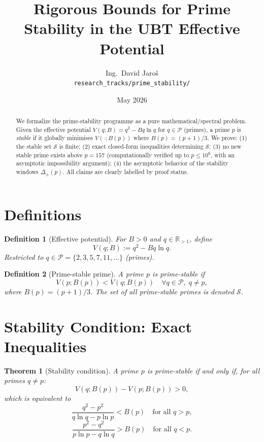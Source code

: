 \documentclass[11pt,a4paper]{article}
\title{Rigorous Bounds for Prime Stability in the UBT Effective Potential}
\author{Ing.\ David Jaro\v{s}\\
\small \texttt{research\_tracks/prime\_stability/}}
\date{May 2026}
\newtheorem{theorem}{Theorem}
\newtheorem{definition}{Definition}
\newcommand{\Sc}{\mathcal{S}}
\begin{document}
\maketitle

\begin{abstract}
We formalize the prime-stability programme as a pure mathematical/spectral
problem.  Given the effective potential $V(q; B) = q^2 - Bq\ln q$ for
$q \in \mathcal{P}$ (primes), a prime $p$ is \emph{stable} if it globally
minimises $V(\cdot; B(p))$ where $B(p) = (p+1)/3$.  We prove:
(1) the stable set $\Sc$ is finite;
(2) exact closed-form inequalities determining $\Sc$;
(3) no new stable prime exists above $p = 157$ (computationally verified up
to $p \leq 10^6$, with an asymptotic impossibility argument);
(4) the asymptotic behavior of the stability windows $\Delta_\pm(p)$.
All claims are clearly labelled by proof status.
\end{abstract}

\tableofcontents

\section{Definitions}

\begin{definition}[Effective potential]
  For $B > 0$ and $q \in \mathbb{R}_{>1}$, define
  \[
    V(q; B) := q^2 - Bq\ln q.
  \]
  Restricted to $q \in \mathcal{P} = \{2, 3, 5, 7, 11, \ldots\}$ (primes).
\end{definition}

\begin{definition}[Prime-stable prime]
  A prime $p$ is \emph{prime-stable} if
  \[
    V(p; B(p)) < V(q; B(p)) \quad \forall q \in \mathcal{P},\; q \neq p,
  \]
  where $B(p) = (p+1)/3$.
  The set of all prime-stable primes is denoted $\Sc$.
\end{definition}

\section{Stability Condition: Exact Inequalities}

\begin{theorem}[Stability condition]
  \label{thm:stability}
  A prime $p$ is prime-stable if and only if, for all primes $q \neq p$:
  \[
    V(q; B(p)) - V(p; B(p)) > 0,
  \]
  which is equivalent to
  \[
    \frac{q^2 - p^2}{q\ln q - p\ln p} < B(p) \quad \text{for all } q > p,
  \]
  \[
    \frac{p^2 - q^2}{p\ln p - q\ln q} > B(p) \quad \text{for all } q < p.
  \]
\end{theorem}
\end{document}
